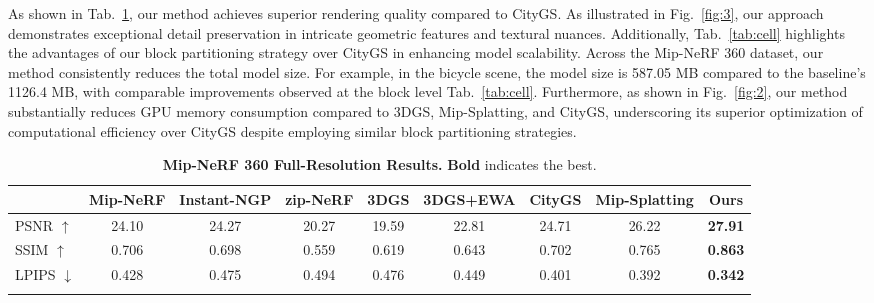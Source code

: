 As shown in Tab.~\ref{tab:D}, our method achieves superior rendering quality compared to CityGS. As illustrated in Fig.~\ref{fig:3}, our approach demonstrates exceptional detail preservation in intricate geometric features and textural nuances. Additionally, Tab.~\ref{tab:cell} highlights the advantages of our block partitioning strategy over CityGS in enhancing model scalability. Across the Mip-NeRF 360 dataset, our method consistently reduces the total model size. For example, in the bicycle scene, the model size is 587.05 MB compared to the baseline's 1126.4 MB, with comparable improvements observed at the block level Tab.~\ref{tab:cell}. Furthermore, as shown in Fig.~\ref{fig:2}, our method substantially reduces GPU memory consumption compared to 3DGS, Mip-Splatting, and CityGS, underscoring its superior optimization of computational efficiency over CityGS despite employing similar block partitioning strategies.



\begin{table}[t]
    \centering
    \caption{\textbf{Mip-NeRF 360 Full-Resolution Results.} \textbf{Bold} indicates the best.}
    \vspace{2pt}
    \footnotesize
    \setlength{\tabcolsep}{3.5pt}
    \begin{tabular}{@{}lcccccccc@{}}
    \toprule
    & Mip-NeRF & Instant-NGP & zip-NeRF & 3DGS & 3DGS+EWA & CityGS & Mip-Splatting & \textbf{Ours} \\
    \midrule
    PSNR $\uparrow$     & 24.10 & 24.27 & 20.27 & 19.59 & 22.81 & 24.71 & {26.22} & {\textbf{27.91}} \\
    SSIM $\uparrow$     & 0.706 & 0.698 & 0.559 & 0.619 & 0.643 & 0.702 & {0.765} & {\textbf{0.863}} \\
    LPIPS $\downarrow$  & 0.428 & 0.475 & 0.494 & 0.476 & 0.449 & 0.401 & {0.392} & {\textbf{0.342}} \\
    \bottomrule
    \label{tab:D}
    \end{tabular}
    \vspace{-0.3cm}
\end{table}







